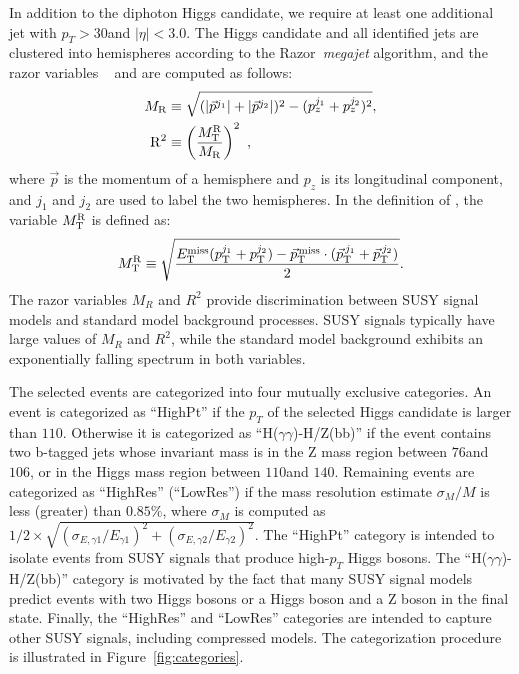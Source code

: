 In addition to the diphoton Higgs candidate, we require at least one additional jet
with $p_{T}>30$\GeV and $|\eta|<3.0$. The Higgs candidate and all identified jets
are clustered into hemispheres according to the Razor~\textit{megajet} algorithm\cite{razorPRD}, and
the razor variables ~\cite{razor2010, rogan} \MR and \Rtwo are computed as follows:
\begin{align}
 \label{eq:MRstar}
 M_\mathrm{R} &\equiv \sqrt{(\lvert \vec{p}^{j_{1}} \rvert+\lvert \vec{p}^{j_{2}} \rvert)^2 -({p}^{j_{1}}_z+{p}^{j_{2}}_z)^2},\\
\mathrm{R}^2 &\equiv \left( \frac{M_\mathrm{T}^\mathrm{R}}{M_\mathrm{R}} \right)^2~,\label{eq:Rtwo}
\end{align}
where $\vec{p}$ is the momentum of a hemisphere and $p_z$ is its longitudinal component, and $j_{1}$ and $j_{2}$ are used to label the two hemispheres. In the definition of \Rtwo, the variable $M_\mathrm{T}^\mathrm{R}$ is defined as:
\begin{equation}
M_\mathrm{T}^\mathrm{R} \equiv \sqrt{ \frac{E_{\mathrm{T}}^{\text{miss}}(p_{\mathrm{T}}^{j_{1}}+p_{\mathrm{T}}^{j_{2}}) -{\vec p}_{\mathrm{T}}^{\kern1pt\text{miss}} \cdot ({\vec p}_{\mathrm{T}}^{\,j_{1}}+{\vec p}_{\mathrm{T}}^{\,j_{2}}) }{2}}.\label{eq:MRT}
\end{equation}
The razor variables $M_{R}$ and $R^{2}$ provide discrimination between SUSY signal models and standard model
background processes. SUSY signals typically have large values of $M_{R}$ and $R^{2}$,
while the standard model background exhibits an exponentially falling spectrum in both variables.


The selected events are categorized into four mutually exclusive categories. An event is categorized as ``HighPt''
if the $p_{T}$ of the selected Higgs candidate is larger than $110$\GeV. Otherwise it is categorized as
``H($\gamma\gamma$)-H/Z(bb)'' if the event contains two b-tagged jets whose invariant mass is in the Z mass region between
$76$\GeV and $106$\GeV, or in the Higgs mass region between $110$\GeV and $140$\GeV. Remaining events are
categorized as ``HighRes'' (``LowRes'') if the mass resolution estimate $\sigma_{M}/M$ is less (greater) than $0.85\%$, where 
$\sigma_{M}$ is computed as $1/2\times\sqrt{(\sigma_{E,\gamma 1}/E_{\gamma 1})^{2} + (\sigma_{E,\gamma 2}/E_{\gamma 2})^{2}}$.
The ``HighPt'' category is intended to isolate events from SUSY signals that produce high-$p_T$ Higgs bosons. 
The ``H($\gamma\gamma$)-H/Z(bb)'' category is motivated by the fact that many SUSY signal models predict events with two Higgs bosons 
or a Higgs boson and a Z boson in the final state. Finally, the ``HighRes'' and ``LowRes'' categories are 
intended to capture other SUSY signals, including compressed models. 
The categorization procedure is illustrated in Figure~\ref{fig:categories}.



